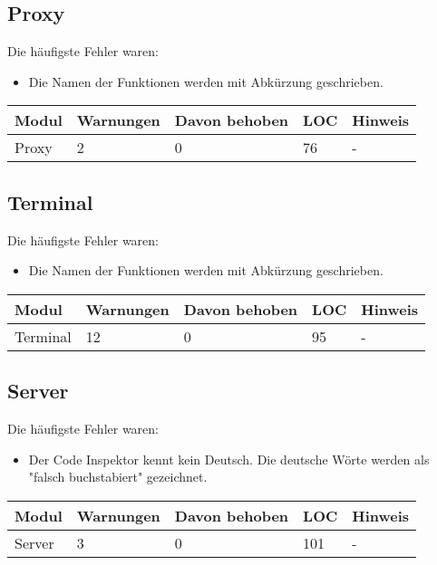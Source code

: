 \documentclass[qualitaetssicherung.tex]{subfiles}
\begin{document}
\subsection{Proxy}
			Die häufigste Fehler waren:
			\begin{itemize}
				\item Die Namen der Funktionen werden mit Abkürzung geschrieben.
			\end{itemize}
			\begin{center}
					\begin{tabular}{| l | l | l | l | l |}
					\hline
					Modul & Warnungen & Davon behoben & LOC & Hinweis\\ \hline
					Proxy & 2 & 0 & 76 & - \\ \hline
					\hline
					\end{tabular}
			\end{center}
			
\subsection{Terminal}
			Die häufigste Fehler waren:
			\begin{itemize}
				\item Die Namen der Funktionen werden mit Abkürzung geschrieben.
			\end{itemize}
			\begin{center}
					\begin{tabular}{| l | l | l | l | l |}
					\hline
					Modul & Warnungen & Davon behoben & LOC & Hinweis\\ \hline
					Terminal & 12 & 0 & 95 & - \\ \hline
					\hline
					\end{tabular}
			\end{center}

\subsection{Server}
			Die häufigste Fehler waren:
			\begin{itemize}
				\item Der Code Inspektor kennt kein Deutsch. Die deutsche Wörte werden als
				"falsch buchstabiert" gezeichnet.
			\end{itemize}
			\begin{center}
					\begin{tabular}{| l | l | l | l | l |}
					\hline
					Modul & Warnungen & Davon behoben & LOC & Hinweis\\ \hline
					Server & 3 & 0 & 101 & - \\ \hline
					\hline
					\end{tabular}
			\end{center}
			
\end{document}
